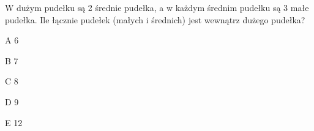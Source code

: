 \begin{tresc}
W dużym pudełku są 2 średnie pudełka, a w każdym średnim pudełku są 3 małe pudełka. Ile łącznie pudełek (małych i średnich) jest wewnątrz dużego pudełka?
\end{tresc}
\begin{wariant}{A} 6 \end{wariant}
\begin{wariant}{B} 7 \end{wariant}
\begin{wariant}{C} 8 \end{wariant}
\begin{wariant}{D} 9 \end{wariant}
\begin{wariant}{E} 12 \end{wariant}
